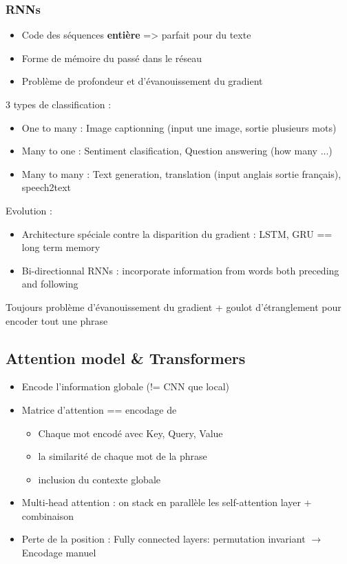 \documentclass{article}
\begin{document}
\begin{multicols}{2}
    \subsubsection{RNNs}
    \begin{itemize}
        \item Code des séquences \textbf{entière} => parfait pour du texte
        \item Forme de mémoire du passé dans le réseau
        \item Problème de profondeur et d'évanouissement du gradient
    \end{itemize}
    3 types de classification :
    \begin{itemize}
        \item One to many : Image captionning (input une image, sortie plusieurs mots)
        \item Many to one : Sentiment clasification, Question answering (how many ...)
        \item Many to many : Text generation, translation (input anglais sortie français), speech2text 
    \end{itemize}
    Evolution : 
    \begin{itemize}
        \item Architecture spéciale contre la disparition du gradient : LSTM, GRU == long term memory 
        \item Bi-directionnal RNNs : incorporate information from words both preceding and following
    \end{itemize}
    Toujours problème d'évanouissement du gradient + goulot d'étranglement pour encoder tout une phrase
    
    \subsection{Attention model \& Transformers }
    \begin{itemize}
        \item Encode l'information globale (!= CNN que local)
        \item Matrice d'attention == encodage de \begin{itemize}
            \item Chaque mot encodé avec Key, Query, Value
            \item la similarité de chaque mot de la phrase
            \item inclusion du contexte globale
        \end{itemize} 
        \item Multi-head attention : on stack en parallèle les self-attention layer + combinaison
        \item Perte de la position : Fully connected layers: permutation invariant $\rightarrow$ Encodage manuel 
    \end{itemize}
    

\end{multicols}
\end{document}
